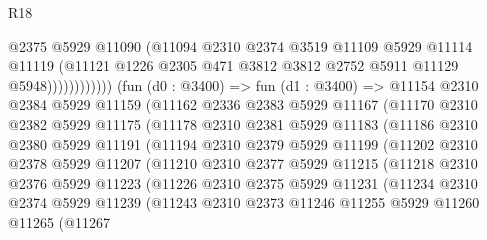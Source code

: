 \begin{lexlean}{R18}
\begin{coremodule}
                            @2375
                            @5929
                            @11090
                            (@11094
                              @2310
                              @2374
                              @3519
                              @11109
                              @5929
                              @11114
                              @11119
                              (@11121
                                @1226
                                @2305
                                @471
                                @3812
                                @3812
                                @2752
                                @5911
                                @11129
                                @5948))))))))))))
        (fun (d0 : @3400) =>
        fun (d1 : @3400) =>
        @11154
          @2310
          @2384
          @5929
          @11159
          (@11162
            @2336
            @2383
            @5929
            @11167
            (@11170
              @2310
              @2382
              @5929
              @11175
              (@11178
                @2310
                @2381
                @5929
                @11183
                (@11186
                  @2310
                  @2380
                  @5929
                  @11191
                  (@11194
                    @2310
                    @2379
                    @5929
                    @11199
                    (@11202
                      @2310
                      @2378
                      @5929
                      @11207
                      (@11210
                        @2310
                        @2377
                        @5929
                        @11215
                        (@11218
                          @2310
                          @2376
                          @5929
                          @11223
                          (@11226
                            @2310
                            @2375
                            @5929
                            @11231
                            (@11234
                              @2310
                              @2374
                              @5929
                              @11239
                              (@11243
                                @2310
                                @2373
                                @11246
                                @11255
                                @5929
                                @11260
                                @11265
                                (@11267

\end{coremodule}
\end{lexlean}
